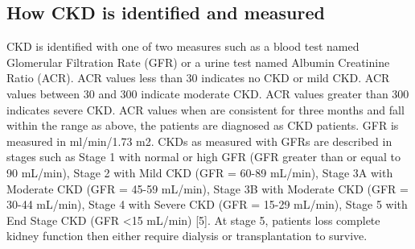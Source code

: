 \subsection{How CKD is identified and measured}
CKD is identified with one of two measures such as a blood test named Glomerular Filtration Rate (GFR) or a urine test named Albumin Creatinine Ratio (ACR).  ACR values less than 30 indicates no CKD or mild CKD. ACR values between 30 and 300 indicate moderate CKD. ACR values greater than 300 indicates severe CKD. ACR values when are consistent for three months and fall within the range as above, the patients are diagnosed as CKD patients. GFR is measured in ml/min/1.73 m2. CKDs as measured with GFRs are described in stages such as Stage 1 with normal or high GFR (GFR greater than or equal to 90 mL/min), Stage 2 with Mild CKD (GFR = 60-89 mL/min), Stage 3A with Moderate CKD (GFR = 45-59 mL/min), Stage 3B with Moderate CKD (GFR = 30-44 mL/min), Stage 4 with Severe CKD (GFR = 15-29 mL/min), Stage 5 with End Stage CKD (GFR <15 mL/min) [5]. At stage 5, patients loss complete kidney function then either require dialysis or transplantation to survive.